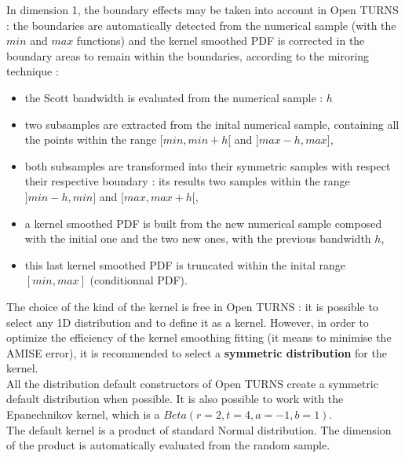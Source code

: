 In dimension 1, the boundary effects may be taken into account in Open TURNS : the boundaries are automatically detected from the numerical sample (with the $min$ and $max$ functions) and the kernel smoothed PDF is corrected in the boundary areas to remain within the boundaries, according to the miroring technique :
\begin{itemize}
\item the Scott bandwidth is evaluated from the numerical sample : $h$
\item two subsamples are extracted from the inital numerical sample, containing all the points within the range $[min, min + h[$ and  $]max-h, max]$,
\item both subsamples are transformed into their symmetric samples with respect their respective boundary : its results two samples within the range  $]min-h, min]$ and  $[max, max+h[$,
\item a kernel smoothed PDF is built from the new numerical sample composed with the initial one and the two new ones, with the previous bandwidth $h$,
\item this last kernel smoothed PDF is truncated within the inital range  $[min, max]$ (conditionnal PDF).
\end{itemize}
The choice of the kind of the kernel is free in Open TURNS : it is possible to select any 1D distribution and to define it as a kernel. However, in order to optimize the efficiency of the kernel smoothing fitting (it means to minimise the AMISE error), it is recommended to select a {\bf symmetric distribution} for the kernel. \\
All the distribution default constructors of Open TURNS create a symmetric default distribution when possible. It is also possible to work with the Epanechnikov kernel, which is a $Beta(r=2, t=4, a=-1, b=1)$. \\
The default kernel is a product of standard Normal distribution. The dimension of the product is automatically evaluated from the random sample.\\

